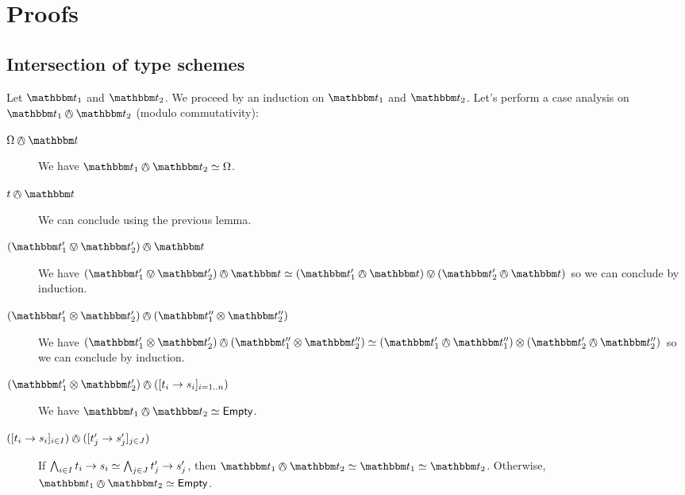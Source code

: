 \documentclass[a4paper]{article}
\theoremstyle{definition}
\begin{document}
    \section{Proofs}

    \subsection{Intersection of type schemes}

    Let $\ts_1$ and $\ts_2$. We proceed by an induction on $\ts_1$ and $\ts_2$.
    Let's perform a case analysis on $\ts_1 \tsand \ts_2$ (modulo commutativity):
    \begin{description}
      \item[$\tsempty \tsand \ts$] We have $\ts_1 \tsand \ts_2 \simeq \tsempty$.
      \item[$t \tsand \ts$] We can conclude using the previous lemma.
      \item[$(\ts_1' \tsor \ts_2') \tsand \ts$] We have
      $(\ts_1' \tsor \ts_2') \tsand \ts \simeq (\ts_1' \tsand \ts) \tsor (\ts_2' \tsand \ts)$
      so we can conclude by induction.
      \item[$(\ts_1' \tstimes \ts_2') \tsand (\ts_1'' \tstimes \ts_2'')$] We have
      $(\ts_1' \tstimes \ts_2') \tsand (\ts_1'' \tstimes \ts_2'') \simeq (\ts_1' \tsand \ts_1'') \tstimes (\ts_2' \tsand \ts_2'')$
      so we can conclude by induction.
      \item[$(\ts_1' \tstimes \ts_2') \tsand (\tsfunone {t_i} {s_i}_{i=1..n})$] We have $\ts_1 \tsand \ts_2 \simeq \Empty$.
      \item[$(\tsfunone {t_i} {s_i}_{i\in I}) \tsand (\tsfunone {t_j'} {s_j'}_{j\in J})$]
      If $\bigwedge_{i\in I} t_i\to s_i \simeq \bigwedge_{j\in J} t_j'\to s_j'$,
      then $\ts_1 \tsand \ts_2 \simeq \ts_1 \simeq \ts_2$.
      Otherwise, $\ts_1 \tsand \ts_2 \simeq \Empty$.
    \end{description}
    
\end{document}
